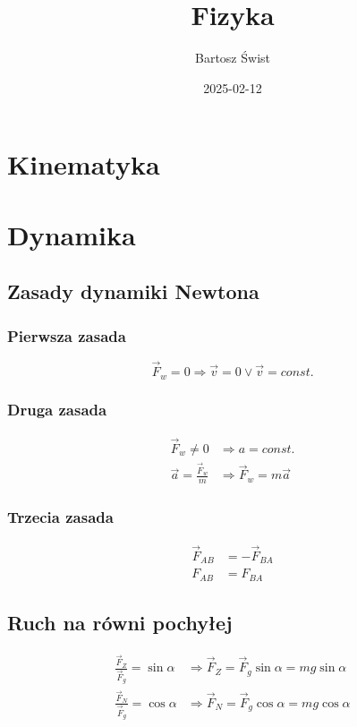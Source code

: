 \documentclass{article}
\title{Fizyka}
\date{2025-02-12}
\author{Bartosz Świst}
\newcommand{\F}{\vec{F}}
\begin{document}
  \maketitle
  \newpage

  \section{Kinematyka}

  \newpage
  \section{Dynamika}
    \subsection{Zasady dynamiki Newtona}
      \subsubsection{Pierwsza zasada}
        \begin{equation*}
          \F_w = 0 \Rightarrow \vec{v} = 0 \lor \vec{v} = const.
        \end{equation*}
      \subsubsection{Druga zasada}
        \begin{align*}
          \F_w \neq 0 &\Rightarrow a = const.\\
          \vec{a} = \frac{\F_w}{m} &\Rightarrow \F_w = m\vec{a}
        \end{align*}
      \subsubsection{Trzecia zasada}
        \begin{align*}
          \F_{AB} &= -\F_{BA}\\
          F_{AB} &= F_{BA}
        \end{align*}
    \subsection{Ruch na równi pochyłej}
      \begin{align*}
        \frac{\F_Z}{\F_g} = \sin\alpha &\Rightarrow \F_Z = \F_g\sin\alpha = mg\sin\alpha\\
        \frac{\F_N}{\F_g} = \cos\alpha &\Rightarrow \F_N = \F_g\cos\alpha = mg\cos\alpha
      \end{align*}
\end{document}
